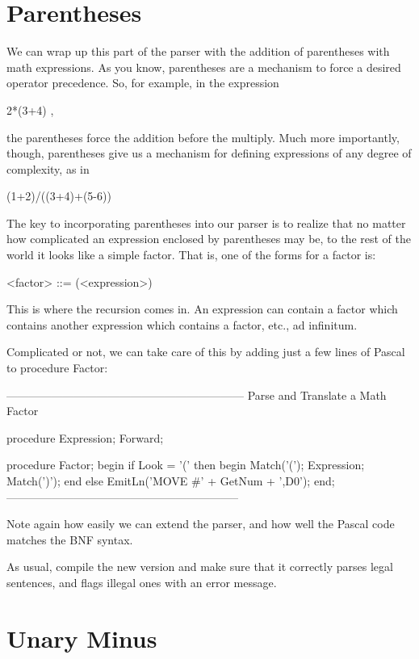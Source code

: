 \documentclass[float=false, crop=false]{standalone}
\begin{document}
\section{Parentheses}

We can wrap up this part of the parser with the addition of parentheses with
math expressions. As you know, parentheses are a mechanism to force a desired
operator precedence. So, for example, in the expression

               2*(3+4) ,

the parentheses force the addition before the multiply. Much more importantly,
though, parentheses give us a mechanism for defining expressions of any degree
of complexity, as in

               (1+2)/((3+4)+(5-6))

The key to incorporating parentheses into our parser is to realize that no
matter how complicated an expression enclosed by parentheses may be, to the rest
of the world it looks like a simple factor. That is, one of the forms for a
factor is:

          <factor> ::= (<expression>)

This is where the recursion comes in. An expression can contain a factor which
contains another expression which contains a factor, etc., ad infinitum.

Complicated or not, we can take care of this by adding just a few lines of
Pascal to procedure Factor:

\begin{code}
{---------------------------------------------------------------}
{ Parse and Translate a Math Factor }

procedure Expression; Forward;

procedure Factor;
begin
   if Look = '(' then begin
      Match('(');
      Expression;
      Match(')');
      end
   else
      EmitLn('MOVE #' + GetNum + ',D0');
end;
{--------------------------------------------------------------}
\end{code}

Note again how easily we can extend the parser, and how well the Pascal code
matches the BNF syntax.

As usual, compile the new version and make sure that it correctly parses legal
sentences, and flags illegal ones with an error message.

\section{Unary Minus}
\end{document}
